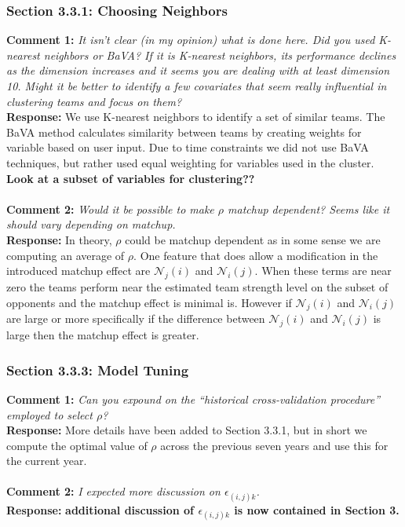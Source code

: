 \documentclass[11pt]{article} %
\begin{document}
\subsubsection*{Section 3.3.1: Choosing Neighbors}
{\bf Comment 1:} \emph{It isn't clear (in my opinion) what is done here. Did you used K-nearest neighbors or BaVA? If it is K-nearest neighbors, its performance declines as the dimension increases and it seems you are dealing with at least dimension 10. Might it be better to identify a few covariates that seem really influential in clustering teams and focus on them?\\}
{\bf Response:} We use K-nearest neighbors to identify a set of similar teams. The BaVA method calculates similarity between teams by creating weights for variable based on user input. Due to time constraints we did not use BaVA techniques, but rather used equal weighting for variables used in the cluster. \\
{\bf Look at a subset of variables for clustering??}\\
\\
{\bf Comment 2:} \emph{Would it be possible to make $\rho$ matchup dependent? Seems like it should vary depending on matchup.\\}
{\bf Response:} In theory, $\rho$ could be matchup dependent as in some sense we are computing an average of $\rho.$ One feature that does allow a modification in the introduced matchup effect are $\mathcal{N}_j(i)$ and $\mathcal{N}_i(j).$ When these terms are near zero the teams perform near the estimated team strength level on the subset of opponents and the matchup effect is minimal is. However if $\mathcal{N}_j(i)$ and $\mathcal{N}_i(j)$ are large or more specifically if the difference between $\mathcal{N}_j(i)$ and $\mathcal{N}_i(j)$ is large then the matchup effect is greater.\\

\subsubsection*{Section 3.3.3: Model Tuning}
{\bf Comment 1:} \emph{Can you expound on the ``historical cross-validation procedure'' employed to select $\rho$?\\}
{\bf Response:} More details have been added to Section 3.3.1, but in short we compute the optimal value of $\rho$ across the previous seven years and use this for the current year.\\
\\
{\bf Comment 2:} \emph{I expected more discussion on $\epsilon_{(i,j)k}$.\\}
{\bf Response:} {\bf additional discussion of $\epsilon_{(i,j)k}$ is now contained in Section 3.}\\
\end{document}
